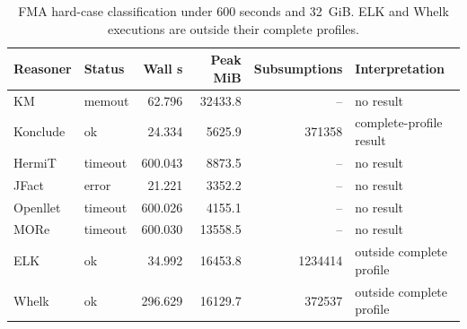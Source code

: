 \begin{table}[t]
\centering
\small
\caption{FMA hard-case classification under 600 seconds and 32~GiB. ELK and Whelk executions are outside their complete profiles.}
\label{tab:fma-results}
\begin{tabular}{llrrrl}
\toprule
Reasoner & Status & Wall s & Peak MiB & Subsumptions & Interpretation \\
\midrule
KM & memout & 62.796 & 32433.8 & -- & no result \\
Konclude & ok & 24.334 & 5625.9 & 371358 & complete-profile result \\
HermiT & timeout & 600.043 & 8873.5 & -- & no result \\
JFact & error & 21.221 & 3352.2 & -- & no result \\
Openllet & timeout & 600.026 & 4155.1 & -- & no result \\
MORe & timeout & 600.030 & 13558.5 & -- & no result \\
ELK & ok & 34.992 & 16453.8 & 1234414 & outside complete profile \\
Whelk & ok & 296.629 & 16129.7 & 372537 & outside complete profile \\
\bottomrule
\end{tabular}
\end{table}
